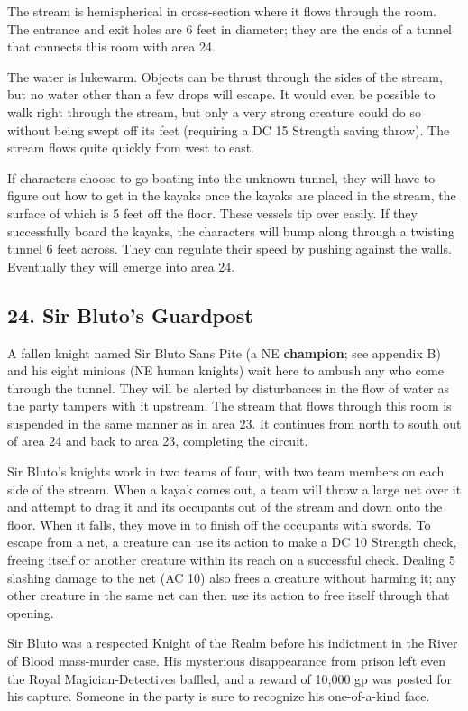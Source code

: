 \documentclass[10pt,a4paper,twoside,bg=print,twocolumn,openany,nodeprecatedcode]{dndbook}
\begin{document}
The stream is hemispherical in cross-section where it flows through the room. The entrance and exit holes are 6 feet in diameter; they are the ends of a tunnel that connects this room with area 24.

The water is lukewarm. Objects can be thrust through the sides of the stream, but no water other than a few drops will escape. It would even be possible to walk right through the stream, but only a very strong creature could do so without being swept off its feet (requiring a DC 15 Strength saving throw). The stream flows quite quickly from west to east.

If characters choose to go boating into the unknown tunnel, they will have to figure out how to get in the kayaks once the kayaks are placed in the stream, the surface of which is 5 feet off the floor. These vessels tip over easily. If they successfully board the kayaks, the characters will bump along through a twisting tunnel 6 feet across. They can regulate their speed by pushing against the walls. Eventually they will emerge into area 24.

\subsection{24. Sir Bluto's Guardpost}
A fallen knight named Sir Bluto Sans Pite (a NE \textbf{champion}; see appendix B) and his eight minions (NE human knights) wait here to ambush any who come through the tunnel. They will be alerted by disturbances in the flow of water as the party tampers with it upstream. The stream that flows through this room is suspended in the same manner as in area 23. It continues from north to south out of area 24 and back to area 23, completing the circuit.

Sir Bluto's knights work in two teams of four, with two team members on each side of the stream. When a kayak comes out, a team will throw a large net over it and attempt to drag it and its occupants out of the stream and down onto the floor. When it falls, they move in to finish off the occupants with swords. To escape from a net, a creature can use its action to make a DC 10 Strength check, freeing itself or another creature within its reach on a successful check. Dealing 5 slashing damage to the net (AC 10) also frees a creature without harming it; any other creature in the same net can then use its action to free itself through that opening.

Sir Bluto was a respected Knight of the Realm before his indictment in the River of Blood mass-murder case. His mysterious disappearance from prison left even the Royal Magician-Detectives baffled, and a reward of 10,000 gp was posted for his capture. Someone in the party is sure to recognize his one-of-a-kind face.
\end{document}

